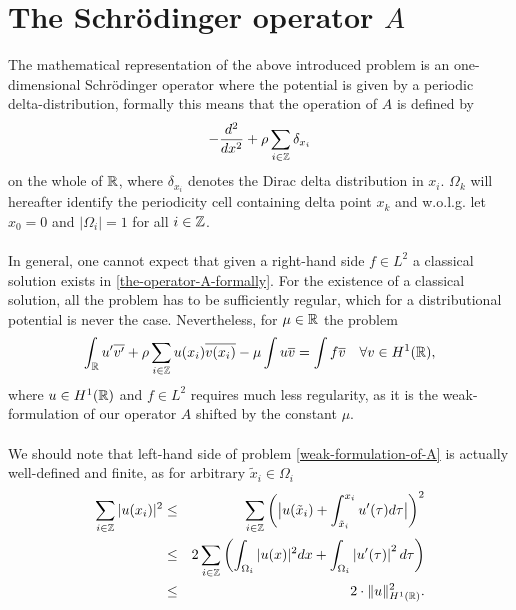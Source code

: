 \chapter{\texorpdfstring{The Schrödinger operator $A$}{The Schrödinger operator A}}
The mathematical representation of the above introduced problem is an one-dimensional Schrödinger operator where the potential is given by a periodic delta-distribution, formally this means that the operation of $A$ is defined by %
\begin{equation}
	- \frac{d^{2}}{dx^{2}} + \rho \sum_{i \in \mathbb{Z}} \delta_{x_{i}} \label{the-operator-A-formally}
\end{equation}
on the whole of $\mathbb{R}$, where $\delta_{x_{i}}$ denotes the Dirac delta distribution in $x_{i}$. $\Omega_{k}$ will hereafter identify the periodicity cell containing delta point $x_{k}$ and w.o.l.g. let $x_{0} = 0$ and $|\Omega_{i}| = 1$ for all $i \in \mathbb{Z}$.
~\\ ~\\ %
In general, one cannot expect that given a right-hand side $f \in L^{2}$  a classical solution exists in \eqref{the-operator-A-formally}. For the existence of a classical solution, all the problem has to be sufficiently regular, which for a distributional potential is never the case. Nevertheless, for $\mu \in \mathbb{R}$ the problem %
\begin{equation}
	\int_{\mathbb{R}} u' \overline{v'} + \rho \sum_{i \in \mathbb{Z}} u(x_{i}) \overline{v(x_{i})} - \mu \int u \overline{v} = \int f \overline{v} \quad \forall v \in H^{1}(\mathbb{R}), \label{weak-formulation-of-A}
\end{equation}	
where $u \in H^{1}(\mathbb{R})$ and $f \in L^{2}$ requires much less regularity, as it is the weak-formulation of our operator $A$ shifted by the constant $\mu$. %
~\\ ~\\ %
We should note that left-hand side of problem \eqref{weak-formulation-of-A} is actually well-defined and finite, as for arbitrary $\tilde{x}_{i} \in \Omega_{i}$
\begin{eqnarray}
	\sum_{i \in \mathbb{Z}} |u(x_{i})|^{2} & \leq & \sum_{i \in \mathbb{Z}} \left( \big| u(\tilde{x}_{i}) + \int_{\tilde{x}_{i}}^{x_{i}} u'( \tau ) d\tau \big| \right)^{2} \notag \\
		 & \leq & 2 \sum_{i \in \mathbb{Z}} \left( \int_{\Omega_{i}} |u( x )|^{2} dx +  \int_{\Omega_{i}} \left| u'(\tau) \right|^{2} d\tau \right) \notag \\
		 & \leq & 2 \cdot \| u \|^{2}_{H^{1}(\mathbb{R})}. \label{estimation-for-potential}
\end{eqnarray}

